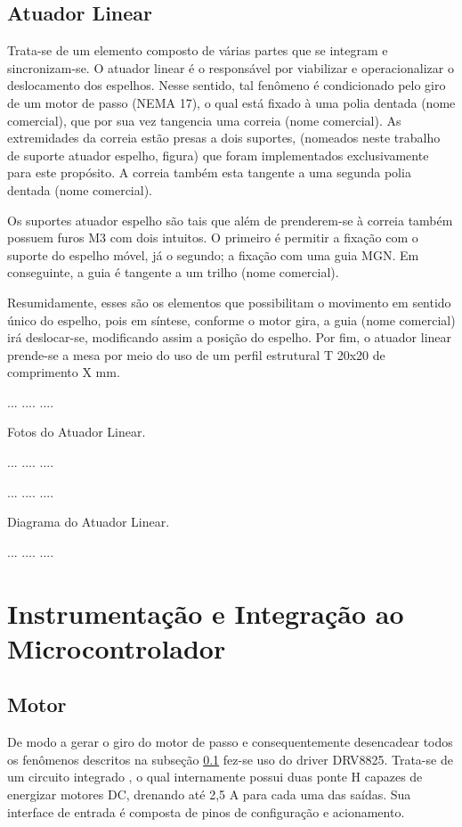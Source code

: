 \documentclass[oneside,openright,12pt]{ufsm_2021} %
\begin{document}
        \subsection{Atuador Linear}
            \label{sub:AtuadorLinear}
            \par Trata-se de um elemento composto de várias partes que se integram e sincronizam-se. O atuador linear é o responsável por viabilizar e operacionalizar o deslocamento dos espelhos. Nesse sentido, tal fenômeno é condicionado pelo giro de um motor de passo (NEMA 17), o qual está fixado à uma polia dentada (nome comercial), que por sua vez tangencia uma correia (nome comercial). As extremidades da correia estão presas a dois suportes, (nomeados neste trabalho de suporte atuador espelho, figura) que foram implementados exclusivamente para este propósito. A correia também esta tangente a uma segunda polia dentada (nome comercial).
            \par Os suportes atuador espelho são tais que além de prenderem-se à correia também possuem furos M3 com dois intuitos. O primeiro é permitir a fixação com o suporte do espelho móvel, já o segundo; a fixação com uma guia MGN. Em conseguinte, a guia é tangente a um trilho (nome comercial). 
            \par Resumidamente, esses são os elementos que possibilitam o movimento em sentido único do espelho, pois em síntese, conforme o motor gira, a guia (nome comercial) irá deslocar-se, modificando assim a posição do espelho. Por fim, o atuador linear prende-se a mesa por meio do uso de um perfil estrutural T 20x20 de comprimento X mm.

            \par ...    ....    ....
            \par Fotos do Atuador Linear.
            \par ...    ....    ....    

            \par ...    ....    ....
            \par Diagrama do Atuador Linear.
            \par ...    ....    ....    
            
    \section{Instrumentação e Integração ao Microcontrolador}        
        \subsection{Motor}
            \par De modo a gerar o giro do motor de passo e consequentemente desencadear todos os fenômenos descritos na subseção \ref{sub:AtuadorLinear} fez-se uso do driver DRV8825. Trata-se de um circuito integrado \cite{data:DrvTexas}, o qual internamente possui duas ponte H capazes de energizar motores DC, drenando até 2,5 A para cada uma das saídas. Sua interface de entrada é composta de pinos de configuração e acionamento. 
            
\end{document}

